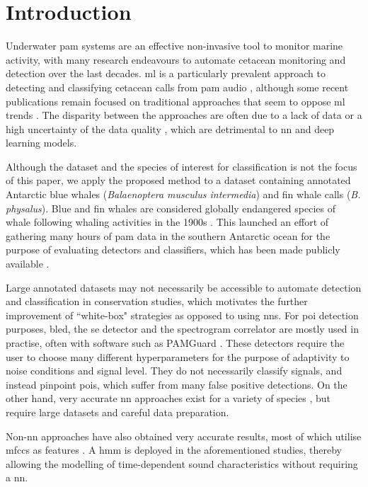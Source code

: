 \section{Introduction}
Underwater \ac{pam} systems are an effective non-invasive tool to monitor marine activity, with many research endeavours to automate cetacean monitoring and detection over the last decades. \Ac{ml} is a particularly prevalent approach to detecting and classifying cetacean calls from \ac{pam} audio \citep{MLreview}, although some recent publications remain focused on traditional approaches that seem to oppose \ac{ml} trends \citep{internalsignaldetection, jacques2}. The disparity between the approaches are often due to a lack of data or a high uncertainty of the data quality \citep{casey2019}, which are detrimental to \ac{nn} and deep learning models. 

Although the dataset and the species of interest for classification is not the focus of this paper, we apply the proposed method to a dataset containing annotated Antarctic blue whales (\textit{Balaenoptera musculus intermedia}) and fin whale calls (\textit{B. physalus}). Blue and fin whales are considered globally endangered species of whale following whaling activities in the 1900s \citep{blue_whale, fin_whale}. This launched an effort of gathering many hours of \ac{pam} data in the southern Antarctic ocean \citep{sorp_sohn} for the purpose of evaluating detectors and classifiers, which has been made publicly available \citep{casey2017}.


Large annotated datasets may not necessarily be accessible to automate detection and classification in conservation studies, which motivates the further improvement of ``white-box" strategies as opposed to using \acp{nn}. For \ac{poi} detection purposes, \ac{bled}, the \ac{se} detector and the spectrogram correlator \citep{casey2017} are mostly used in practise, often with software such as PAMGuard \citep{PAMGuard}. These detectors require the user to choose many different hyperparameters for the purpose of adaptivity to noise conditions and signal level. They do not necessarily classify signals, and instead pinpoint \acp{poi}, which suffer from many false positive detections. On the other hand, very accurate \ac{nn} approaches exist for a variety of species \citep{MLalexnet, cnn_multiple_whale_classes, narw_cn_denoising, cnn_fin_whale}, but require large datasets and careful data preparation.


Non-\ac{nn} approaches have also obtained very accurate results, most of which utilise \acp{mfcc} as features \citep{MFCC_HMM_birds, hmm2}. A \ac{hmm} is deployed in the aforementioned studies, thereby allowing the modelling of time-dependent sound characteristics without requiring a \ac{nn}.

